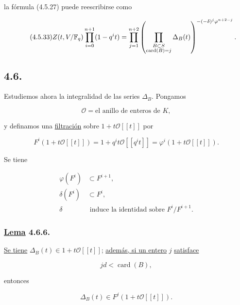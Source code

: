 la fórmula (4.5.27) puede reescribirse como

\begin{equation}\tag{\sisi{4.5.23}{4.5.33}}
Z(t,V/\mathbb F_q)\prod_{i=0}^{n+1}(1-q^it)
=\prod_{j=1}^{n+2}
\left(
\prod_{\substack{B\subset S\\\operatorname{card}(B)=j}}
\Delta_B(t)
\right)^{-(-\delta)^j\varphi^{n+2-j}}.
\end{equation}

\subsection*{4.6.}
Estudiemos ahora la integralidad de las series $\Delta_B$. Pongamos

\begin{equation}\tag{4.6.1}
\mathcal O=\text{el anillo de enteros de $K$},
\end{equation}

y definamos una \underline{filtración} sobre $1+t\mathcal O[[t]]$ por

\begin{equation}\tag{4.6.2}
F^i(1+t\mathcal O[[t]])
=1+q^it\mathcal O[[q^it]]
=\varphi^i(1+t\mathcal O[[t]]).
\end{equation}

Se tiene

\begin{align}
\varphi(F^i)&\subset F^{i+1}, \tag{4.6.3}\\
\delta(F^i)&\subset F^i, \tag{4.6.4}\\
\delta&\text{ induce la identidad sobre }F^i/F^{i+1}. \tag{4.6.5}
\end{align}

\subsubsection*{\underline{Lema} 4.6.6.}
\underline{Se tiene} $\Delta_B(t)\in1+t\mathcal O[[t]]$; \underline{además, si un entero} $j$
\underline{satisface}

\begin{equation}\tag{4.6.7}
jd<\operatorname{card}(B),
\end{equation}

entonces

\begin{equation}\tag{4.6.8}
\Delta_B(t)\in F^j(1+t\mathcal O[[t]]).
\end{equation}

\pageoriginale

